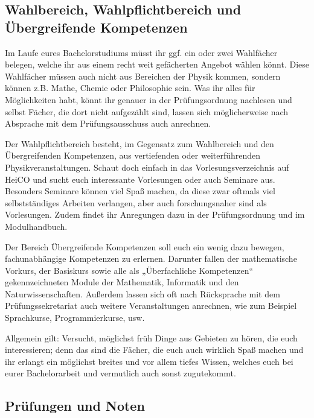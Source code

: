 \subsection{Wahlbereich, Wahlpflichtbereich und \\Übergreifende Kompetenzen}

Im Laufe eures Bachelorstudiums müsst ihr ggf. ein oder zwei Wahlfächer belegen, welche ihr aus einem recht weit gefächerten Angebot wählen könnt. Diese Wahlfächer müssen auch nicht aus Bereichen der Physik kommen, sondern können z.B. Mathe, Chemie oder Philosophie sein. Was ihr alles für Möglichkeiten habt, könnt ihr genauer in der Prüfungsordnung nachlesen und selbst Fächer, die dort nicht aufgezählt sind, lassen sich möglicherweise nach Absprache mit dem Prüfungsausschuss auch anrechnen.

Der Wahlpflichtbereich besteht, im Gegensatz zum Wahlbereich und den Übergreifenden Kompetenzen, aus vertiefenden oder weiterführenden Physikveranstaltungen. Schaut doch einfach in das Vorlesungsverzeichnis auf HeiCO und sucht euch interessante Vorlesungen oder auch Seminare aus. Besonders Seminare können viel Spaß machen, da diese zwar oftmals viel selbstständiges Arbeiten verlangen, aber auch forschungsnaher sind als Vorlesungen. Zudem findet ihr Anregungen dazu in der Prüfungsordnung und im Modulhandbuch.

Der Bereich Übergreifende Kompetenzen soll euch ein wenig dazu bewegen, fachunabhängige Kompetenzen zu erlernen. Darunter fallen der mathematische Vorkurs, der Basiskurs sowie alle als „Überfachliche Kompetenzen“ gekennzeichneten Module der Mathematik, Informatik und den Naturwissenschaften. Außerdem lassen sich oft nach Rücksprache mit dem Prüfungssekretariat auch weitere Veranstaltungen anrechnen, wie zum Beispiel Sprachkurse, Programmierkurse, usw.

Allgemein gilt: Versucht, möglichst früh Dinge aus Gebieten zu hören, die euch interessieren; denn das sind die Fächer, die euch auch wirklich Spaß machen und ihr erlangt ein möglichst breites und vor allem tiefes Wissen, welches euch bei eurer Bachelorarbeit und vermutlich auch sonst zugutekommt.

\subsection{Prüfungen und Noten}

